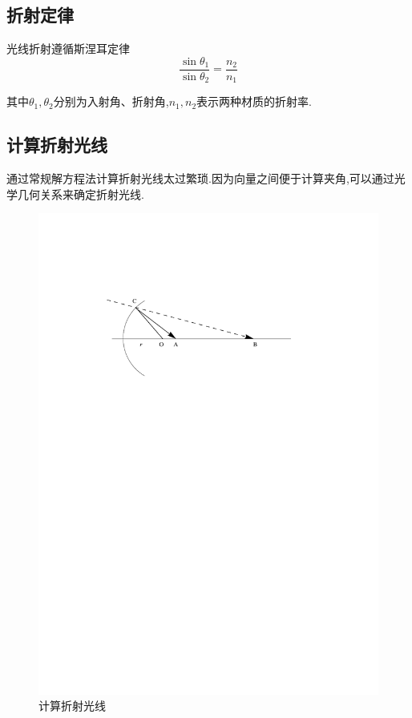 \documentclass[10pt,twocolumn]{article}
\begin{document}
\subsection{\hei 折射定律}
光线折射遵循斯涅耳定律
\begin{equation}
\frac{\sin{\theta_1}}{\sin{\theta_2}}=\frac{n_2}{n_1}
\end{equation}

其中$\theta_1,\theta_2$分别为入射角、折射角,$n_1,n_2$表示两种材质的折射率.

\subsection{\hei 计算折射光线}
通过常规解方程法计算折射光线太过繁琐.因为向量之间便于计算夹角,可以通过光学几何关系来确定折射光线.

\begin{figure}[ht]
\centering
\includegraphics[scale=0.6]{fig10.pdf}
\caption{计算折射光线}
\end{figure}
\end{document}
